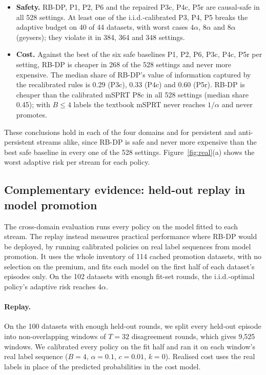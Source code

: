 \documentclass{article}
\theoremstyle{plain}
\theoremstyle{definition}
\theoremstyle{remark}
\begin{document}
\begin{itemize}
\item \textbf{Safety.} RB-DP, P1, P2, P6 and the repaired P3c, P4c, P5r are causal-safe in all 528 settings. At least one of the i.i.d.-calibrated P3, P4, P5 breaks the adaptive budget on 40 of 44 datasets, with worst cases $4\alpha$, $8\alpha$ and $8\alpha$ (geysers); they violate it in 384, 364 and 348 settings.
\item \textbf{Cost.} Against the best of the six safe baselines P1, P2, P6, P3c, P4c, P5r per setting, RB-DP is cheaper in 268 of the 528 settings and never more expensive. The median share of RB-DP's value of information captured by the recalibrated rules is 0.29 (P3c), 0.33 (P4c) and 0.60 (P5r). RB-DP is cheaper than the calibrated mSPRT P8c in all 528 settings (median share 0.45); with $B\le4$ labels the textbook mSPRT never reaches $1/\alpha$ and never promotes.
\end{itemize}
These conclusions hold in each of the four domains and for persistent and anti-persistent streams alike, since RB-DP is safe and never more expensive than the best safe baseline in every one of the 528 settings. Figure~\ref{fig:real}(a) shows the worst adaptive risk per stream for each policy.


\subsection{Complementary evidence: held-out replay in model promotion}
\label{sec:replay}

The cross-domain evaluation runs every policy on the model fitted to each stream. The replay instead measures practical performance where RB-DP would be deployed, by running calibrated policies on real label sequences from model promotion. It uses the whole inventory of 114 cached promotion datasets, with no selection on the premium, and fits each model on the first half of each dataset's episodes only. On the 102 datasets with enough fit-set rounds, the i.i.d.-optimal policy's adaptive risk reaches $4\alpha$.

\paragraph{Replay.} On the 100 datasets with enough held-out rounds, we split every held-out episode into non-overlapping windows of $T=32$ disagreement rounds, which gives 9{,}525 windows. We calibrated every policy on the fit half and ran it on each window's real label sequence ($B=4$, $\alpha=0.1$, $c=0.01$, $k=0$). Realised cost uses the real labels in place of the predicted probabilities in the cost model.
\end{document}
